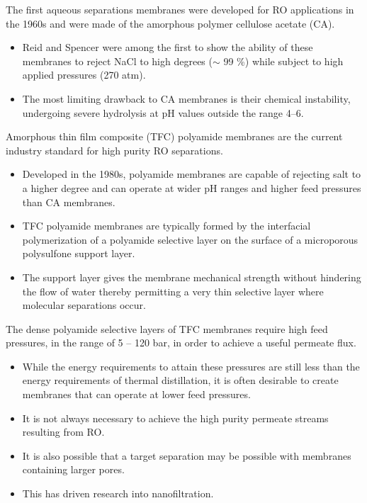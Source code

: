   The first aqueous separations membranes were developed for RO applications 
  in the 1960s and were made of the amorphous polymer cellulose acetate (CA).~\cite{kesting_semipermeable_1965}
  \begin{itemize}
    \item Reid and Spencer were among the first to show the ability of
    these membranes to reject NaCl to high degrees ($\sim$ 99 \%) while subject 
    to high applied pressures (270 atm).~\cite{reid_ultrafiltration_1960}
    \item The most limiting drawback to CA membranes is their chemical instability, 
    undergoing severe hydrolysis at pH values outside the range 4--6.~\cite{vos_kinetic_1966}
  \end{itemize}
  
  Amorphous thin film composite (TFC) polyamide membranes are the current industry 
  standard for high purity RO separations.~\cite{baker_membrane_2012}
  \begin{itemize}  
    \item Developed in the 1980s, polyamide membranes are capable of rejecting salt
    to a higher degree and can operate at wider pH ranges and higher feed pressures than 
    CA membranes.~\cite{cadotte_interfacial_1981}
    \item TFC polyamide membranes are typically formed by the interfacial polymerization
    of a polyamide selective layer on the surface of a microporous polysulfone support 
    layer.    
    \item The support layer gives the membrane mechanical strength without hindering the
    flow of water thereby permitting a very thin selective layer where molecular 
    separations occur.~\cite{kucera_biofouling_2019}
  \end{itemize}
  
  The dense polyamide selective layers of TFC membranes require high feed pressures,
  in the range of 5 -- 120 bar, in order to achieve a useful permeate flux.~\cite{van_der_bruggen_review_2003}
  \begin{itemize}
    \item While the energy requirements to attain these pressures are still less than 
    the energy requirements of thermal distillation\cite{morton_environmental_1997}, it 
    is often desirable to create membranes that can operate at lower feed pressures.
    \item It is not always necessary to achieve the high purity permeate streams
    resulting from RO.
    \item It is also possible that a target separation may be possible with 
    membranes containing larger pores.
    \item This has driven research into nanofiltration.
  \end{itemize}
  
